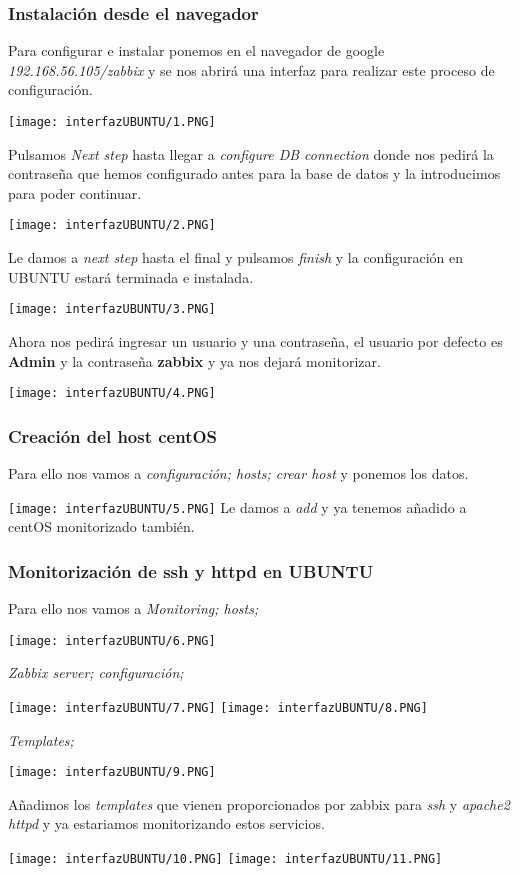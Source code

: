 \documentclass[a4paper, 12pt]{article}
\begin{document}
\subsubsection{Instalación desde el navegador} 
{Para configurar e instalar ponemos en el navegador de google \textit{192.168.56.105/zabbix} y se nos abrirá una interfaz para realizar este proceso de configuración. \par}
\texttt{[image: interfazUBUNTU/1.PNG]}
{Pulsamos \textit{Next step} hasta llegar a \textit{configure DB connection} donde nos pedirá la contraseña que hemos configurado antes para la base de datos y la introducimos para poder continuar. \par}
\texttt{[image: interfazUBUNTU/2.PNG]}
\newpage
{Le damos a \textit{next step} hasta el final y pulsamos \textit{finish} y la configuración en UBUNTU estará terminada e instalada. \par}
\texttt{[image: interfazUBUNTU/3.PNG]}
{\par Ahora nos pedirá ingresar un usuario y una contraseña, el usuario por defecto es \textbf{Admin} y la contraseña \textbf{zabbix} y ya nos dejará monitorizar. \par}
\texttt{[image: interfazUBUNTU/4.PNG]}
\newpage
\subsubsection{Creación del host centOS}
{Para ello nos vamos a \textit{configuración; hosts; crear host} y ponemos los datos. \par}
\texttt{[image: interfazUBUNTU/5.PNG]}
{Le damos a \textit{add} y ya tenemos añadido a centOS monitorizado también.}
\subsubsection{Monitorización de ssh y httpd en UBUNTU}
{Para ello nos vamos a \textit{Monitoring; hosts;} \par}
\texttt{[image: interfazUBUNTU/6.PNG]}
{\par \textit{Zabbix server; configuración;} \par}
\texttt{[image: interfazUBUNTU/7.PNG]}
\texttt{[image: interfazUBUNTU/8.PNG]}
{\par \textit{Templates;} \par} 
\texttt{[image: interfazUBUNTU/9.PNG]}
{\par Añadimos los \textit{templates} que vienen proporcionados por zabbix para \textit{ssh} y \textit{apache2 httpd} y ya estariamos monitorizando estos servicios.}
\texttt{[image: interfazUBUNTU/10.PNG]}
\texttt{[image: interfazUBUNTU/11.PNG]}
\newpage
\end{document}
